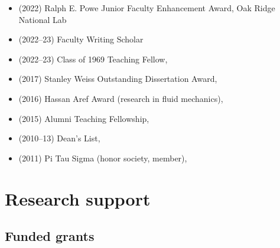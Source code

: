\begin{itemize}
    \item (2022) Ralph E. Powe Junior Faculty Enhancement Award, Oak Ridge National Lab
    \item (2022--23) \GT Faculty Writing Scholar
    \item (2022--23) Class of 1969 Teaching Fellow, \GIT
    \item (2017) Stanley Weiss Outstanding Dissertation Award, \UIUC
    \item (2016) Hassan Aref Award (research in fluid mechanics), \UIUC
    \item (2015) Alumni Teaching Fellowship, \UIUC
    \item (2010--13) Dean's List, \UMD
    \item (2011) Pi Tau Sigma (honor society, member), \UMD
\end{itemize}

\section{Research support}



\subsection{Funded grants}

